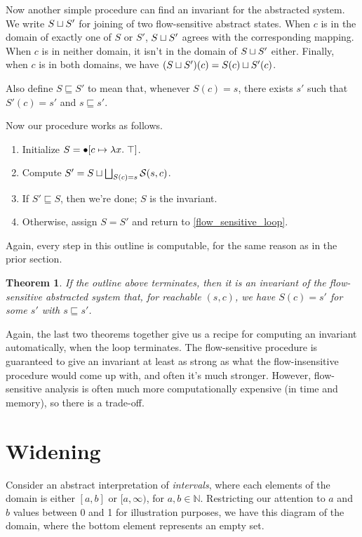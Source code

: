 \documentclass{amsbook}
\newtheorem{theorem}{Theorem}[chapter]
\theoremstyle{definition}
\theoremstyle{remark}
\numberwithin{section}{chapter}
\numberwithin{equation}{chapter}
\begin{document}
Now another simple procedure can find an invariant for the abstracted system.
We write $S \sqcup S'$ for joining of two flow-sensitive abstract states.
When $c$ is in the domain of exactly one of $S$ or $S'$, $S \sqcup S'$ agrees with the corresponding mapping.
When $c$ is in neither domain, it isn't in the domain of $S \sqcup S'$ either.
Finally, when $c$ is in both domains, we have $(S \sqcup S')(c) = S(c) \sqcup S'(c)$.

Also define $S \sqsubseteq S'$ to mean that, whenever $S(c) = s$, there exists $s'$ such that $S'(c) = s'$ and $s \sqsubseteq s'$.

Now our procedure works as follows.

\begin{enumerate}
\item Initialize $S = \bullet[c \mapsto \lambda x. \; \top]$.
\item \label{flow_sensitive_loop}Compute $S' = S \sqcup \bigsqcup_{S(c) = s} \mathcal S(s, c)$.
\item If $S' \sqsubseteq S$, then we're done; $S$ is the invariant.
\item Otherwise, assign $S = S'$ and return to \ref{flow_sensitive_loop}.
\end{enumerate}

Again, every step in this outline is computable, for the same reason as in the prior section.

\begin{theorem}\label{flow_sensitive_iteration}
  \invariants
  If the outline above terminates, then it is an invariant of the flow-sensitive abstracted system that, for reachable $(s, c)$, we have $S(c) = s'$ for some $s'$ with $s \sqsubseteq s'$.
\end{theorem}

Again, the last two theorems together give us a recipe for computing an invariant automatically, when the loop terminates.
The flow-sensitive procedure is guaranteed to give an invariant at least as strong as what the flow-insensitive procedure would come up with, and often it's much stronger.
However, flow-sensitive analysis is often much more computationally expensive (in time and memory), so there is a trade-off.


\section{Widening}

Consider an abstract interpretation of \emph{intervals}, where each elements of the domain is either $[a, b]$ or $[a, \infty)$, for $a, b \in \mathbb N$.
Restricting our attention to $a$ and $b$ values between 0 and 1 for illustration purposes, we have this diagram of the domain, where the bottom element represents an empty set.
\end{document}
